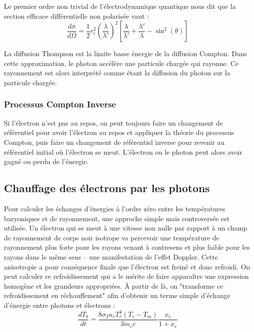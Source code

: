 \documentclass[10pt, a4paper]{report}
\numberwithin{equation}{subsection}
\begin{document}
 Le premier ordre non trivial de l'électrodynamique quantique nous dit que la section efficace différentielle non polarisée vaut :
\begin{equation} \label{eq:QED}
\boxed{\frac{d\sigma}{d\Omega} = \frac{1}{2} r_e^2 \left(\frac{\lambda}{\lambda'}\right)^{2} \left[\frac{\lambda}{\lambda'} + \frac{\lambda'}{\lambda} - \sin^2(\theta)\right]}
\end{equation}

La diffusion Thompson est la limite basse énergie de la diffusion Compton. Dans cette approximation, le photon accélère une particule chargée qui rayonne. Ce rayonnement est alors interprété comme étant la diffusion du photon sur la particule chargée. 

\subsubsection{Processus Compton Inverse}
Si l'électron n'est pas au repos, on peut toujours faire un changement de référentiel pour avoir l'électron au repos et appliquer la théorie du processus Compton, puis faire un changement de référentiel inverse pour revenir au référentiel initial où l'électron se meut. L'électron ou le photon peut alors avoir gagné ou perdu de l'énergie.


\subsection{Chauffage des électrons par les photons}

Pour calculer les échanges d'énergies à l'ordre zéro entre les températures baryoniques et de rayonnement, une approche simple mais controversée est utilisée. Un électron qui se meut à une vitesse non nulle par rapport à un champ de rayonnement de corps noir isotrope va percevoir une température de rayonnement plus forte pour les rayons venant à contresens et plus faible pour les rayons dans le même sens -- une manifestation de l'effet Doppler. Cette anisotropie a pour conséquence finale que l'électron est freiné et donc refroidi. On peut calculer ce refroidissement qui a le mérite de faire apparaître une expression homogène et les grandeurs appropriées. À partir de là, on "transforme ce refroidissement en réchauffement" afin d'obtenir un terme simple d'échange d'énergie entre photons et électrons : 
\begin{equation} \label{eq:ITBTR}
\boxed{\frac{dT_b}{dt} = \frac{8\sigma_Ta_rT_r^4(T_r-T_m)}{3m_ec}\frac{x_e}{1+x_e}}
\end{equation}
\end{document}

